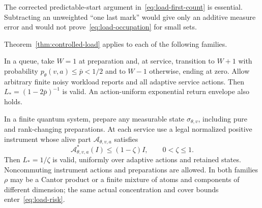 The corrected predictable-start argument in~\eqref{eq:load-first-count} is essential. Subtracting an unweighted ``one last mark'' would give only an additive measure error and would not prove~\eqref{eq:load-occupation} for small sets.

\begin{corollary}\label{cor:raw-geometries}
Theorem~\ref{thm:controlled-load} applies to each of the following families.

In a queue, take $W=1$ at preparation and, at service, transition to $W+1$ with probability $p_\theta(v,a)\le\bar p<1/2$ and to $W-1$ otherwise, ending at zero. Allow arbitrary finite noisy workload reports and all adaptive service actions. Then $L_*=(1-2\bar p)^{-1}$ is valid. An action-uniform exponential return envelope also holds.

In a finite quantum system, prepare any measurable state $\sigma_{\theta,v}$, including pure and rank-changing preparations. At each service use a legal normalized positive instrument whose alive part $\mathcal A_{\theta,v,a}$ satisfies
\[
 \mathcal A_{\theta,v,a}^*(I)\le(1-\zeta)I,
 \qquad 0<\zeta\le1.
\]
Then $L_*=1/\zeta$ is valid, uniformly over adaptive actions and retained states. Noncommuting instrument actions and preparations are allowed. In both families $\rho$ may be a Cantor product or a finite mixture of atoms and components of different dimension; the same actual concentration and cover bounds enter~\eqref{eq:load-risk}.
\end{corollary}
